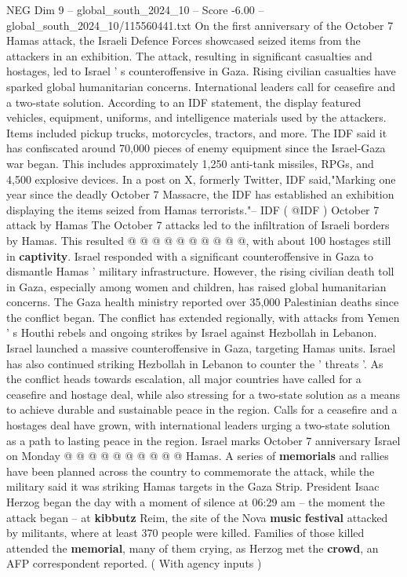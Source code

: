 \begin{textsample}{NEG Dim 9 – global\_south\_2024\_10 – Score -6.00 – global\_south\_2024\_10/115560441.txt}  \label{ex:f9_neg_276}
On the first anniversary of the October 7 Hamas attack, the Israeli Defence Forces showcased seized items from the attackers in an exhibition.
The attack, resulting in significant casualties and hostages, led to Israel ' s counteroffensive in Gaza.
Rising civilian casualties have sparked global humanitarian concerns.
International leaders call for ceasefire and a two-state solution.
According to an IDF statement, the display featured vehicles, equipment, uniforms, and intelligence materials used by the attackers.
Items included pickup trucks, motorcycles, tractors, and more.
The IDF said it has confiscated around 70,000 pieces of enemy equipment since the Israel-Gaza war began.
This includes approximately 1,250 anti-tank missiles, RPGs, and 4,500 explosive devices.
In a post on X, formerly Twitter, IDF said,"Marking one year since the deadly October 7 Massacre, the IDF has established an exhibition displaying the items seized from Hamas terrorists."-- IDF ( @IDF ) October 7 attack by Hamas The October 7 attacks led to the infiltration of Israeli borders by Hamas.
This resulted @ @ @ @ @ @ @ @ @ @, with about 100 hostages still in \textbf{captivity}.
Israel responded with a significant counteroffensive in Gaza to dismantle Hamas ' military infrastructure.
However, the rising civilian death toll in Gaza, especially among women and children, has raised global humanitarian concerns.
The Gaza health ministry reported over 35,000 Palestinian deaths since the conflict began.
The conflict has extended regionally, with attacks from Yemen ' s Houthi rebels and ongoing strikes by Israel against Hezbollah in Lebanon.
Israel launched a massive counteroffensive in Gaza, targeting Hamas units.
Israel has also continued striking Hezbollah in Lebanon to counter the ' threats '.
As the conflict heads towards escalation, all major countries have called for a ceasefire and hostage deal, while also stressing for a two-state solution as a means to achieve durable and sustainable peace in the region.
Calls for a ceasefire and a hostages deal have grown, with international leaders urging a two-state solution as a path to lasting peace in the region.
Israel marks October 7 anniversary Israel on Monday @ @ @ @ @ @ @ @ @ @ Hamas.
A series of \textbf{memorials} and rallies have been planned across the country to commemorate the attack, while the military said it was striking Hamas targets in the Gaza Strip.
President Isaac Herzog began the day with a moment of silence at 06:29 am -- the moment the attack began -- at \textbf{kibbutz} Reim, the site of the Nova \textbf{music} \textbf{festival} attacked by militants, where at least 370 people were killed.
Families of those killed attended the \textbf{memorial}, many of them crying, as Herzog met the \textbf{crowd}, an AFP correspondent reported. ( With agency inputs )

\end{textsample}
